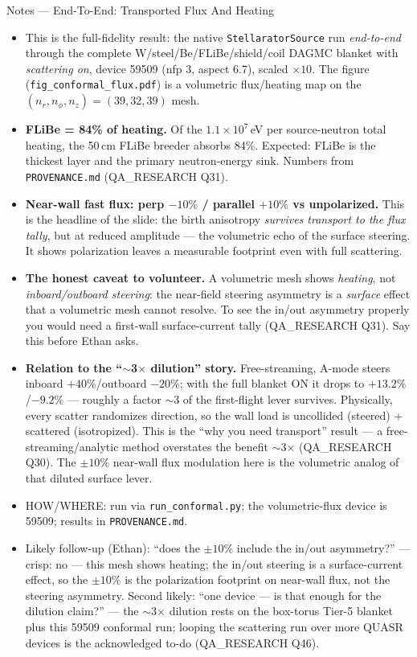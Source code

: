 \documentclass[11pt,aspectratio=169]{beamer}
\begin{document}
\begin{frame}[allowframebreaks]{Notes --- End-To-End: Transported Flux And Heating}
{\color{red}\footnotesize
\begin{itemize}
\item This is the full-fidelity result: the native \texttt{StellaratorSource} run \emph{end-to-end}
      through the complete W/steel/Be/FLiBe/shield/coil DAGMC blanket with \emph{scattering on},
      device 59509 (nfp 3, aspect 6.7), scaled $\times10$. The figure (\texttt{fig\_conformal\_flux.pdf})
      is a volumetric flux/heating map on the $(n_r,n_\phi,n_z)=(39,32,39)$ mesh.
\item \textbf{FLiBe = 84\% of heating.} Of the $1.1\times10^7$\,eV per source-neutron total heating,
      the 50\,cm FLiBe breeder absorbs 84\%. Expected: FLiBe is the thickest layer and the primary
      neutron-energy sink. Numbers from \texttt{PROVENANCE.md} (QA\_RESEARCH Q31).
\item \textbf{Near-wall fast flux: perp $-10\%$ / parallel $+10\%$ vs unpolarized.} This is the
      headline of the slide: the birth anisotropy \emph{survives transport to the flux tally}, but at
      reduced amplitude --- the volumetric echo of the surface steering. It shows polarization leaves a
      measurable footprint even with full scattering.
\item \textbf{The honest caveat to volunteer.} A volumetric mesh shows \emph{heating}, not
      \emph{inboard/outboard steering}: the near-field steering asymmetry is a \emph{surface} effect
      that a volumetric mesh cannot resolve. To see the in/out asymmetry properly you would need a
      first-wall surface-current tally (QA\_RESEARCH Q31). Say this before Ethan asks.
\item \textbf{Relation to the ``$\sim$3$\times$ dilution'' story.} Free-streaming, A-mode steers
      inboard $+40\%$/outboard $-20\%$; with the full blanket ON it drops to $+13.2\%$/$-9.2\%$ ---
      roughly a factor $\sim$3 of the first-flight lever survives. Physically, every scatter
      randomizes direction, so the wall load is uncollided (steered) + scattered (isotropized). This
      is the ``why you need transport'' result --- a free-streaming/analytic method overstates the
      benefit $\sim$3$\times$ (QA\_RESEARCH Q30). The $\pm10\%$ near-wall flux modulation here is the
      volumetric analog of that diluted surface lever.
\item HOW/WHERE: run via \texttt{run\_conformal.py}; the volumetric-flux device is 59509; results in
      \texttt{PROVENANCE.md}.
\item Likely follow-up (Ethan): ``does the $\pm10\%$ include the in/out asymmetry?'' --- crisp: no ---
      this mesh shows heating; the in/out steering is a surface-current effect, so the $\pm10\%$ is the
      polarization footprint on near-wall flux, not the steering asymmetry. Second likely: ``one
      device --- is that enough for the dilution claim?'' --- the $\sim$3$\times$ dilution rests on the
      box-torus Tier-5 blanket plus this 59509 conformal run; looping the scattering run over more
      QUASR devices is the acknowledged to-do (QA\_RESEARCH Q46).
\end{itemize}
}
\end{frame}
\end{document}
